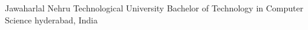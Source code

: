 \cventry
    {Jawaharlal Nehru Technological University} %
    {Bachelor of Technology in Computer Science} %
    {hyderabad, India} %
    {} %
    {
    }
    {
    }
